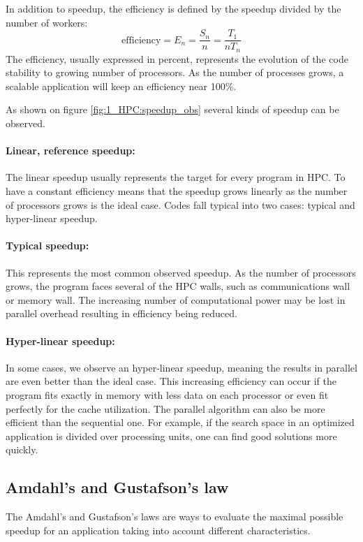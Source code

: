 In addition to speedup, the efficiency is defined by the speedup divided by the number of workers: 
\begin{equation}
\text{efficiency} = E_n = \frac{S_n}{n} = \frac{T_1}{nT_n}
\end{equation}
The efficiency, usually expressed in percent, represents the evolution of the code stability to growing number of processors. 
As the number of processes grows, a scalable application will keep an efficiency near 100\%.


As shown on figure \ref{fig:1_HPC:speedup_obs} several kinds of speedup can be observed. 
\paragraph{Linear, reference speedup: }
The linear speedup usually represents the target for every program in HPC. 
To have a constant efficiency means that the speedup grows linearly as the number of processors grows is the ideal case. 
Codes fall typical into two cases: typical and hyper-linear speedup. 
\paragraph{Typical speedup: }
This represents the most common observed speedup. 
As the number of processors grows, the program faces several of the HPC walls, such as communications wall or memory wall. 
The increasing number of computational power may be lost in parallel overhead resulting in efficiency being reduced. 
\paragraph{Hyper-linear speedup: }
In some cases, we observe an hyper-linear speedup, meaning the results in parallel are even better than the ideal case. 
This increasing efficiency can occur if the program fits exactly in memory with less data on each processor or even fit perfectly for the cache utilization. 
The parallel algorithm can also be more efficient than the sequential one.
For example, if the search space in an optimized application is divided over processing units, one can find good solutions more quickly.

\subsection{Amdahl's and Gustafson's law}
The Amdahl's and Gustafson's laws are ways to evaluate the maximal possible speedup for an application taking into account different characteristics. 

